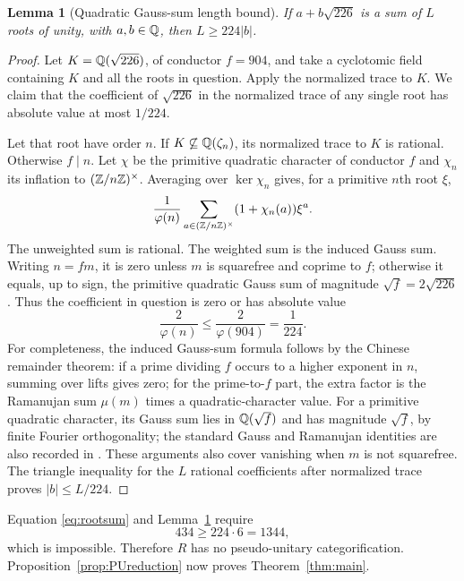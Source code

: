 \documentclass[11pt]{article}
\newtheorem{lemma}[theorem]{Lemma}
\theoremstyle{remark}\newtheorem{remark}[theorem]{Remark}
\begin{document}
\begin{lemma}[Quadratic Gauss-sum length bound]\label{lem:Gauss}
If $a+b\sqrt{226}$ is a sum of $L$ roots of unity, with $a,b\in\mathbb Q$, then $L\ge224|b|$.
\end{lemma}
\begin{proof}
Let $K=\mathbb Q(\sqrt{226})$, of conductor $f=904$, and take a cyclotomic field containing $K$ and all the roots in question. Apply the normalized trace to $K$. We claim that the coefficient of $\sqrt{226}$ in the normalized trace of any single root has absolute value at most $1/224$.

Let that root have order $n$. If $K\not\subseteq\mathbb Q(\zeta_n)$, its normalized trace to $K$ is rational. Otherwise $f\mid n$. Let $\chi$ be the primitive quadratic character of conductor $f$ and $\chi_n$ its inflation to $(\mathbb Z/n\mathbb Z)^\times$. Averaging over $\ker\chi_n$ gives, for a primitive $n$th root $\xi$,
\[
\frac{1}{\varphi(n)}\sum_{a\in(\mathbb Z/n\mathbb Z)^\times}(1+\chi_n(a))\xi^a.
\]
The unweighted sum is rational. The weighted sum is the induced Gauss sum. Writing $n=fm$, it is zero unless $m$ is squarefree and coprime to $f$; otherwise it equals, up to sign, the primitive quadratic Gauss sum of magnitude $\sqrt f=2\sqrt{226}$. Thus the coefficient in question is zero or has absolute value
\[
\frac{2}{\varphi(n)}\le\frac{2}{\varphi(904)}=\frac1{224}.
\]
For completeness, the induced Gauss-sum formula follows by the Chinese remainder theorem: if a prime dividing $f$ occurs to a higher exponent in $n$, summing over lifts gives zero; for the prime-to-$f$ part, the extra factor is the Ramanujan sum $\mu(m)$ times a quadratic-character value. For a primitive quadratic character, its Gauss sum lies in $\mathbb Q(\sqrt f)$ and has magnitude $\sqrt f$, by finite Fourier orthogonality; the standard Gauss and Ramanujan identities are also recorded in \cite[Section 27.10]{DLMF}. These arguments also cover vanishing when $m$ is not squarefree. The triangle inequality for the $L$ rational coefficients after normalized trace proves $|b|\le L/224$.
\end{proof}

Equation \eqref{eq:rootsum} and Lemma~\ref{lem:Gauss} require
\[
434\ge224\cdot6=1344,
\]
which is impossible. Therefore $R$ has no pseudo-unitary categorification. Proposition~\ref{prop:PUreduction} now proves Theorem~\ref{thm:main}.
\end{document}
